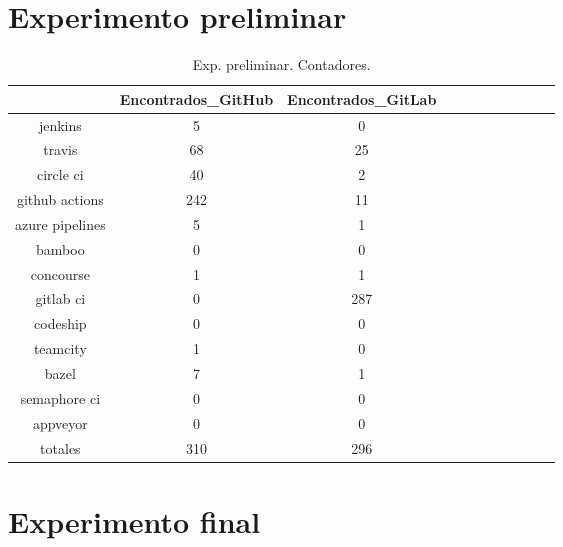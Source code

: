 \section{Experimento preliminar}

\begin{table}[h]
  \centering
  \caption{Exp. preliminar. Contadores.}
  \label{tab:tabla_p1}

\begin{footnotesize}
\renewcommand{\arraystretch}{1.5} %
\begin{tabular}{ccccccccccc}
  \hline
  {} &  Encontrados\_GitHub &  Encontrados\_GitLab \\
  \hline
  jenkins         &                   5 &                   0 \\
  travis          &                  68 &                  25 \\
  circle ci       &                  40 &                   2 \\
  github actions  &                 242 &                  11 \\
  azure pipelines &                   5 &                   1 \\
  bamboo          &                   0 &                   0 \\
  concourse       &                   1 &                   1 \\
  gitlab ci       &                   0 &                 287 \\
  codeship        &                   0 &                   0 \\
  teamcity        &                   1 &                   0 \\
  bazel           &                   7 &                   1 \\
  semaphore ci    &                   0 &                   0 \\
  appveyor        &                   0 &                   0 \\
  totales         &                 310 &                 296 \\
 \end{tabular}
\end{footnotesize}

\end{table}

\section{Experimento final}

